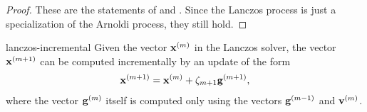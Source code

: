 \begin{proof}
  These are the statements of
   and
  . Since the Lanczos
  process is just a specialization of the Arnoldi process, they still
  hold.
\end{proof}

\begin{Lemma}{lanczos-incremental}
  Given the vector $\mathbf x^{(m)}$ in the Lanczos solver, the vector
  $\mathbf x^{(m+1)}$ can be computed incrementally by an update of the form
  \begin{gather}
    \mathbf x^{(m+1)} = \mathbf x^{(m)} + \zeta_{m+1}\mathbf g^{(m+1)},
  \end{gather}
  where the vector $\mathbf g^{(m)}$ itself is computed only using the
  vectors $\mathbf g^{(m-1)}$ and $\mathbf v^{(m)}$.
\end{Lemma}

